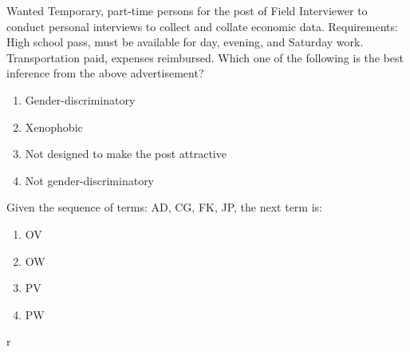 \item Wanted Temporary, part-time persons for the post of Field Interviewer to conduct personal interviews to collect and collate economic data. Requirements: High school pass, must be available for day, evening, and Saturday work. Transportation paid, expenses reimbursed.  
Which one of the following is the best inference from the above advertisement?
    \begin{enumerate}
        \item Gender-discriminatory
        \item Xenophobic
        \item Not designed to make the post attractive
        \item Not gender-discriminatory
    \end{enumerate}

\item Given the sequence of terms: AD, CG, FK, JP, the next term is:
    \begin{enumerate}
        \item OV
        \item OW
        \item PV
        \item PW
    \end{enumerate}

r
